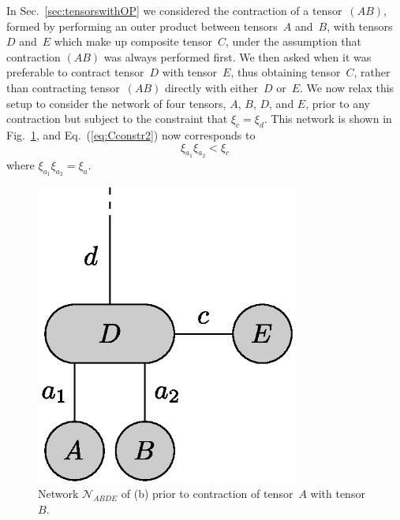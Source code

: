 \documentclass[aps,pre,reprint,superscriptaddress,amsfonts,amsmath,showpacs,nofootinbib,floatfix]{revtex4-1}
\newcommand{\mc}[1]{\mathcal{#1}}
\newcommand{\Eref}[1]{Eq.~(\ref{#1})}
\newcommand{\fref}[1]{Fig.~\ref{#1}}
\newcommand{\sref}[1]{Sec.~\ref{#1}}
\newcommand{\pfref}[1]{\protect{Fig.~\ref{#1}}}
\newcommand{\xa}{\xi_a}
\newcommand{\xc}{\xi_c}
\newcommand{\xd}{\xi_d}
\begin{document}
In \sref{sec:tensorswithOP} we considered the contraction of a tensor~$(AB)$, formed by performing an outer product between tensors~$A$ and~$B$, with tensors~$D$ and~$E$ which make up composite tensor~$C$, under the assumption that contraction $(AB)$ was always performed first. We then asked when it was preferable to contract tensor~$D$ with tensor~$E$, thus obtaining tensor~$C$, rather than contracting tensor~$(AB)$ directly with either~$D$ or~$E$. We now relax this setup to consider the network of four tensors, $A$, $B$, $D$, and $E$, prior to any contraction but subject to the constraint that $\xc=\xd$. This network is shown in \fref{fig:ABDE}, and \Eref{eq:Cconstr2} now corresponds to
\begin{equation}
\xi_{a_1}\xi_{a_2}<\xc\label{eq:ABDECconstr1}
\end{equation}
where $\xi_{a_1}\xi_{a_2}=\xa$.
\begin{figure}
\includegraphics[width=246.0pt]{ABDE}
\caption{Network $\mc{N}_{ABDE}$ of \pfref{fig:(AB)DE}(b) prior to contraction of tensor~$A$ with tensor~$B$.\label{fig:ABDE}}
\end{figure}%
\end{document}
